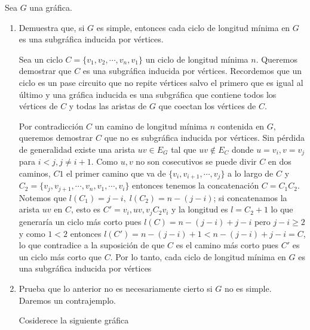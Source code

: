 Sea $G$ una gráfica.
\begin{enumerate}
    \item Demuestra que, si $G$ es simple, entonces cada ciclo de longitud mínima en $G$ es una subgráfica inducida por vértices.

          Sea un ciclo $C=\{v_1,v_2,\cdots,v_n,v_1\}$ un ciclo de longitud mínima $n$. Queremos demostrar que $C$ es una subgráfica inducida por vértices.
          Recordemos que un ciclo es un pase circuito que no repite vértices salvo el primero que es igual al último y una gráfica inducida es una subgráfica que contiene todos los vértices de $C$ y todas las aristas de $G$ que coectan los vértices de $C$.

          Por contradicción
          $C$ un camino de longitud mínima $n$ contenida en $G$, queremos demostrar $C$ que no es subgráfica inducida por vértices.
          Sin pérdida de generalidad existe una arista $uv\in E_G$ tal que $uv\notin E_C$ donde $u=v_i, v=v_j$ para $i<j,j\neq i+1$. Como $u,v$ no son cosecutivos se puede divir $C$ en dos caminos, $C1$ el primer camino que va de $\{v_i,v_{i+1},\cdots,v_j\}$ a lo largo de $C$ y $C_2=\{v_j,v_{j+1},\cdots,v_n,v_1,\cdots,v_i\}$ entonces tenemos la concatenación $C=C_1C_2$.  Notemos que $l(C_1)=j-i,\;l(C_2)=n-(j-i)$; si concatenamos la arista $uv$ en $C$, esto es $C'=v_i,uv,v_jC_2v_i$ y la longitud es $l=C_2+1$ lo que generaría un ciclo más corto pues $l(C)=n-(j-i)+j-i$ pero $j-i\geq2$ y como $1<2$ entonces $l(C')=n-(j-i)+1<n-(j-i)+j-i=C$, lo que contradice a la suposición de que $C$ es el camino más corto pues $C'$ es un ciclo más corto que $C$.
          Por lo tanto, cada ciclo de longitud mínima en $G$ es una subgráfica inducida por vértices

    \item Prueba que lo anterior no es necesariamente cierto si $G$ no es simple.
          Daremos un contrajemplo.

          Cosiderece la siguiente gráfica
          \begin{figure}[!hbt]
              \begin{center}
\end{center}
\end{figure}
\end{enumerate}

